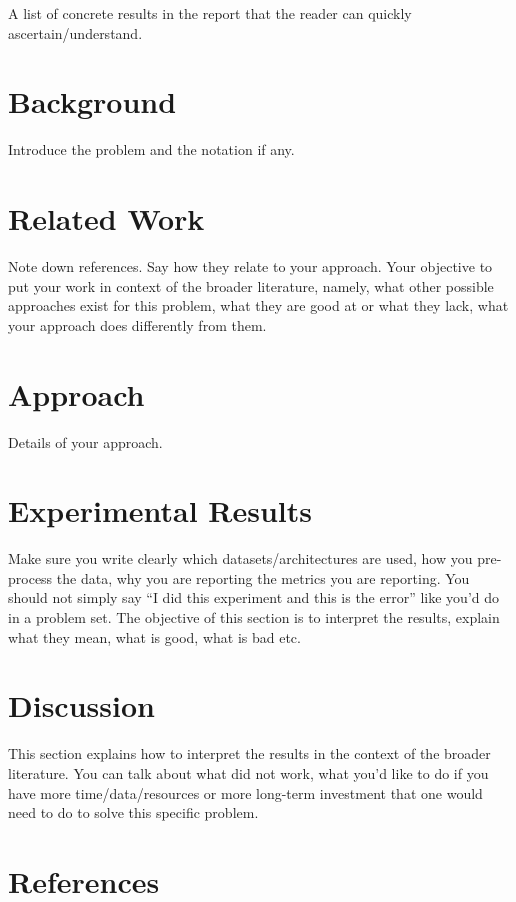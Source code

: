 \documentclass[10pt, reqno, letterpaper, twoside]{amsart}
\begin{document}
A list of concrete results in the report that the reader can quickly ascertain/understand.

\section{Background}

Introduce the problem and the notation if any.

\section{Related Work}

Note down references. Say how they relate to your approach. Your objective to put your work in context of the broader literature, namely, what other possible approaches exist for this problem, what they are good at or what they lack, what your approach does differently from them.

\section{Approach}

Details of your approach.

\section{Experimental Results}

Make sure you write clearly which datasets/architectures are used, how you pre-process the data, why you are reporting the metrics you are reporting. You should not simply say ``I did this experiment and this is the error'' like you'd do in a problem set. The objective of this section is to interpret the results, explain what they mean, what is good, what is bad etc.

\section{Discussion}

This section explains how to interpret the results in the context of the broader literature. You can talk about what did not work, what you'd like to do if you have more time/data/resources or more long-term investment that one would need to do to solve this specific problem.

\section*{References}
\end{document}
